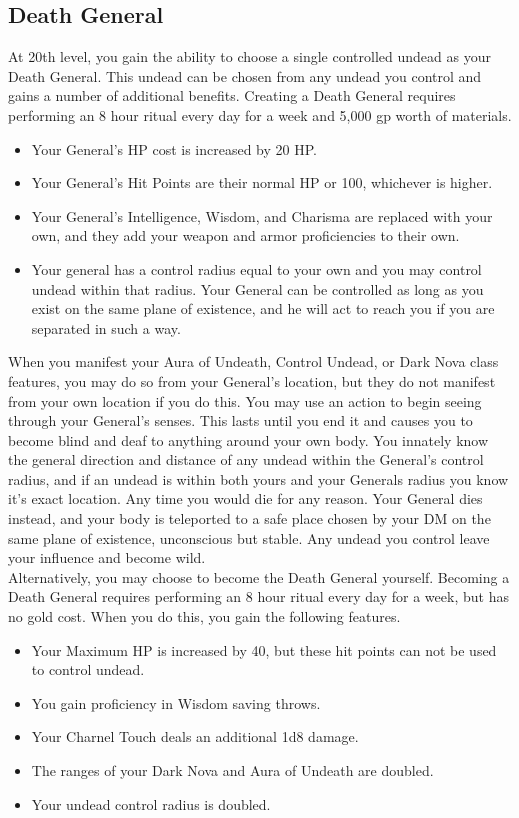 \documentclass[10pt,twoside,twocolumn,openany]{book}
\begin{document}
\subsection{Death General}
At 20th level, you gain the ability to choose a single controlled undead as your Death General. This undead can be chosen from any undead you control and gains a number of additional benefits.
Creating a Death General requires performing an 8 hour ritual every day for a week and 5,000 gp worth of materials.
\begin{itemize}
\item Your General’s HP cost is increased by 20 HP.
\item Your General’s Hit Points are their normal HP or 100, whichever is higher.
\item Your General’s Intelligence, Wisdom, and Charisma are replaced with your own, and they add your weapon and armor proficiencies to their own.
\item Your general has a control radius equal to your own and you may control undead within that radius. Your General can be controlled as long as you exist on the same plane of existence, and he will act to reach you if you are separated in such a way.
\end{itemize}
When you manifest your Aura of Undeath, Control Undead, or Dark Nova class features, you may do so from your General’s location, but they do not manifest from your own location if you do this.
You may use an action to begin seeing through your General’s senses. This lasts until you end it and causes you to become blind and deaf to anything around your own body.
You innately know the general direction and distance of any undead within the General’s control radius, and if an undead is within both yours and your Generals radius you know it’s exact location.
Any time you would die for any reason. Your General dies instead, and your body is teleported to a safe place chosen by your DM on the same plane of existence, unconscious but stable. Any undead you control leave your influence and become wild.\\
Alternatively, you may choose to become the Death General yourself. Becoming a Death General requires performing an 8 hour ritual every day for a week, but has no gold cost. When you do this, you gain the following features.

\begin{itemize}
\item Your Maximum HP is increased by 40, but these hit points can not be used to control undead.
\item You gain proficiency in Wisdom saving throws.
\item Your Charnel Touch deals an additional 1d8 damage.
\item The ranges of your Dark Nova and Aura of Undeath are doubled.
\item Your undead control radius is doubled.
\end{itemize}
\end{document}
